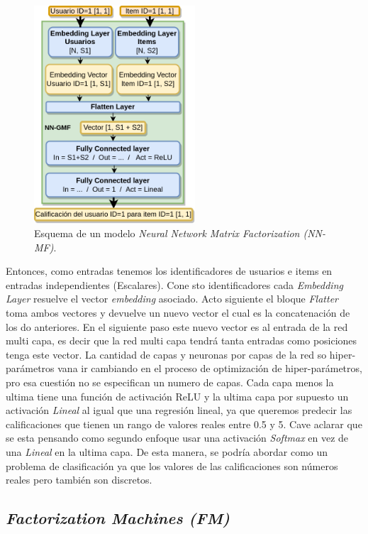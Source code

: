 \documentclass[11pt,a4paper,twoside]{thesis}
\begin{document}
\begin{figure}[h!]
	\centering
	\includegraphics[width=6cm]{./images/NN-MF.png}

	\caption{
		Esquema de un modelo \textit{Neural Network Matrix Factorization (NN-MF)}.
	}
	\label{fig:NNMFModel}
\end{figure}


Entonces, como entradas tenemos los identificadores de usuarios e items en entradas independientes (Escalares). Cone sto identificadores cada \textit{Embedding Layer} resuelve el vector \textit{embedding} asociado. Acto siguiente el bloque \textit{Flatter} toma ambos vectores y devuelve un nuevo vector el cual es la concatenación de los do anteriores. En el siguiente paso este nuevo vector es al entrada de la red multi capa, es decir que la red multi capa tendrá tanta entradas como posiciones tenga este vector. La cantidad de capas y neuronas por capas de la red so hiper-parámetros vana  ir cambiando en el proceso de optimización de hiper-parámetros, pro esa cuestión no se especifican un numero de capas. Cada capa menos la ultima tiene una función de activación ReLU y la ultima capa por supuesto un activación \textit{Lineal} al igual que una regresión lineal, ya que queremos predecir las calificaciones que tienen un rango de valores reales entre 0.5 y 5. Cave aclarar que se esta pensando como segundo enfoque usar una activación \textit{Softmax} en vez de una \textit{Lineal} en la ultima capa. De esta manera, se podría abordar como un problema de clasificación ya que los valores de las calificaciones son números reales pero también son discretos.


\clearpage

\subsection{\textit{Factorization Machines (FM)}}
\end{document}
